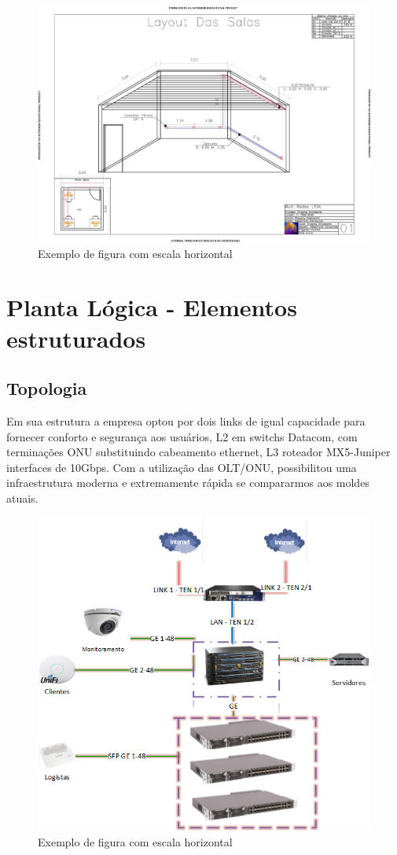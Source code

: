 \documentclass[	DIV=calc,%
							paper=a4,%
							fontsize=12pt,%
							onecolumn]{scrartcl}	 					%
\begin{document}
\begin{figure}
\centering
\includegraphics[width=\textwidth]{layout-sala}
\caption{Exemplo de figura com escala horizontal}
\label{rack}
\end{figure}

\section{Planta Lógica - Elementos estruturados}


\subsection{Topologia}
Em sua estrutura a empresa optou por dois links de igual capacidade para fornecer conforto e segurança aos usuários, L2 em switchs Datacom, com terminações ONU substituindo cabeamento ethernet, L3 roteador  MX5-Juniper interfaces de 10Gbps. 
Com a utilização das OLT/ONU, possibilitou uma infraestrutura moderna e extremamente rápida se compararmos aos moldes atuais.
\begin{figure}
\centering
\includegraphics[width=\textwidth]{topologia}
\caption{Exemplo de figura com escala horizontal}
\label{topologia}
\end{figure}
\end{document}
